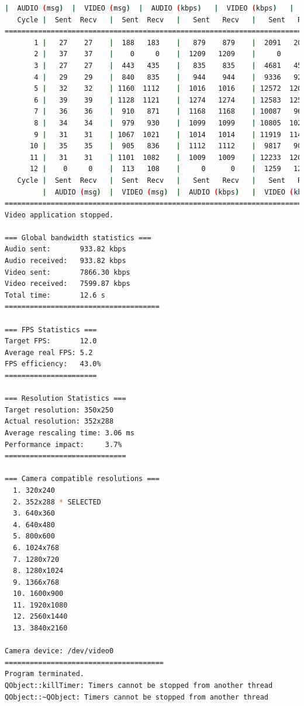 \begin{lstlisting}[language=bash,basicstyle=\ttfamily\tiny]
         |  AUDIO (msg)  |  VIDEO (msg)  |  AUDIO (kbps)   |  VIDEO (kbps)   |     CPU (%) 
   Cycle |  Sent  Recv   |  Sent  Recv   |   Sent   Recv   |   Sent   Recv   | Program System
================================================================================================
       1 |   27    27    |  188   183    |   879    879    |  2091   2038    |  21      0       
       2 |   37    37    |    0     0    |  1209   1209    |     0      0    |  43     78       
       3 |   27    27    |  443   435    |   835    835    |  4681   4597    |  42     80       
       4 |   29    29    |  840   835    |   944    944    |  9336   9281    |  35     76       
       5 |   32    32    | 1160  1112    |  1016   1016    | 12572  12054    |  45     68       
       6 |   39    39    | 1128  1121    |  1274   1274    | 12583  12508    |  48     75       
       7 |   36    36    |  910   871    |  1168   1168    | 10087   9652    |  47     73       
       8 |   34    34    |  979   930    |  1099   1099    | 10805  10266    |  39     73       
       9 |   31    31    | 1067  1021    |  1014   1014    | 11919  11404    |  32     73       
      10 |   35    35    |  905   836    |  1112   1112    |  9817   9067    |  28     79       
      11 |   31    31    | 1101  1082    |  1009   1009    | 12233  12024    |  39     71       
      12 |    0     0    |  113   108    |     0      0    |  1259   1206    |   1     34       
   Cycle |  Sent  Recv   |  Sent  Recv   |   Sent   Recv   |   Sent   Recv   | Program System
         |  AUDIO (msg)  |  VIDEO (msg)  |  AUDIO (kbps)   |  VIDEO (kbps)   |     CPU (%) 
===========================================================================================
Video application stopped.

=== Global bandwidth statistics ===
Audio sent:       933.82 kbps
Audio received:   933.82 kbps
Video sent:       7866.30 kbps
Video received:   7599.87 kbps
Total time:       12.6 s
=====================================

=== FPS Statistics ===
Target FPS:       12.0
Average real FPS: 5.2
FPS efficiency:   43.0%
======================

=== Resolution Statistics ===
Target resolution: 350x250
Actual resolution: 352x288
Average rescaling time: 3.06 ms
Performance impact:     3.7%
=============================

=== Camera compatible resolutions ===
  1. 320x240
  2. 352x288 * SELECTED
  3. 640x360
  4. 640x480
  5. 800x600
  6. 1024x768
  7. 1280x720
  8. 1280x1024
  9. 1366x768
  10. 1600x900
  11. 1920x1080
  12. 2560x1440
  13. 3840x2160

Camera device: /dev/video0
======================================
Program terminated.
QObject::killTimer: Timers cannot be stopped from another thread
QObject::~QObject: Timers cannot be stopped from another thread
\end{lstlisting}
\vspace{\baselineskip}

